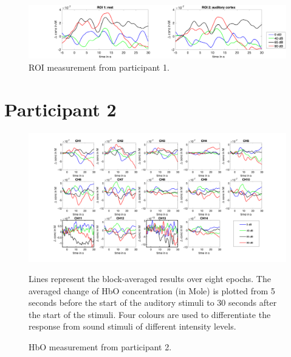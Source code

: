 \begin{figure}[H]
  \centering
    \includegraphics[scale=.29]{bilder/ROI/sub_chang_s_HbO.png}
  \caption{ROI measurement from participant 1.}
\end{figure}
\newpage


\section {Participant 2}

\begin{figure}[H]
  \centering
    \includegraphics[scale=.4]{bilder/HbO_Mole/sub_gleb2_s_HbO.png}
  \caption{HbO measurement from participant 2.}
  \label{fig:somesignal}
  \medskip
  \footnotesize {Lines represent the block-averaged results over eight epochs. The averaged change of HbO concentration (in Mole) is plotted from 5 seconds before the start of the auditory stimuli to 30 seconds after the start of the stimuli. Four colours are used to differentiate the response from sound stimuli of different intensity levels.}
\end{figure}

\newpage


